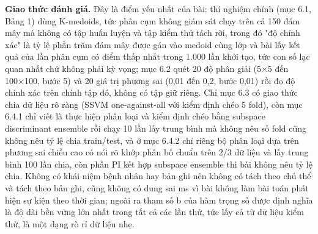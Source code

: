 \documentclass[12pt,a4paper]{article}
\begin{document}
\noindent \textbf{Giao thức đánh giá.} Đây là điểm yếu nhất của bài: thí nghiệm chính (mục 6.1, Bảng 1) dùng K-medoids, tức phân cụm không giám sát chạy trên cả 150 đám mây mà không có tập huấn luyện và tập kiểm thử tách rời, trong đó "độ chính xác" là tỷ lệ phần trăm đám mây được gán vào medoid cùng lớp và bài lấy kết quả của lần phân cụm có điểm thấp nhất trong 1.000 lần khởi tạo, tức con số lạc quan nhất chứ không phải kỳ vọng; mục 6.2 quét 20 độ phân giải (5×5 đến 100×100, bước 5) và 20 giá trị phương sai (0,01 đến 0,2, bước 0,01) rồi đo độ chính xác trên chính tập đó, không có tập giữ riêng. Chỉ mục 6.3 có giao thức chia dữ liệu rõ ràng (SSVM one-against-all với kiểm định chéo 5 fold), còn mục 6.4.1 chỉ viết là thực hiện phân loại và kiểm định chéo bằng subspace discriminant ensemble rồi chạy 10 lần lấy trung bình mà không nêu số fold cũng không nêu tỷ lệ chia train/test, và ở mục 6.4.2 chỉ riêng bộ phân loại dựa trên phương sai chiều cao có nói rõ khớp phân bố chuẩn trên 2/3 dữ liệu và lấy trung bình 100 lần chia, còn phần PI kết hợp subspace ensemble thì bài không nêu tỷ lệ chia. Không có khái niệm bệnh nhân hay bản ghi nên không có tách theo chủ thể và tách theo bản ghi, cũng không có dung sai ms vì bài không làm bài toán phát hiện sự kiện theo thời gian; ngoài ra tham số b của hàm trọng số được định nghĩa là độ dài bền vững lớn nhất trong tất cả các lần thử, tức lấy cả từ dữ liệu kiểm thử, là một dạng rò rỉ dữ liệu nhẹ.\par\vspace{3pt}
\end{document}
